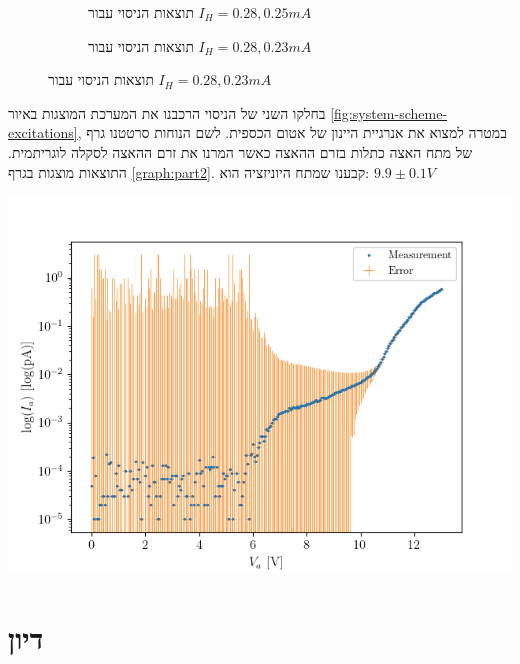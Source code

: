 \documentclass{article}
\begin{document}
\begin{figure}[H]
    \begin{subfigure}[b]{\textwidth}
    	\centering
	\resizebox{0.95\textwidth}{!}{}
    	\caption{תוצאות הניסוי עבור 
    	$I_H =0.28,0.25 mA$}
    	\label{fig:Changing_Ih_25-28mA}
    \end{subfigure}
    \hfill
    \begin{subfigure}[b]{\textwidth}
    	\centering
    	\resizebox{0.95\textwidth}{!}{}
    	\caption{תוצאות הניסוי עבור 
    	$I_H =0.28,0.23 mA$}
    	\label{fig:Changing_Ih_23-28mA}
    \end{subfigure}
\end{figure}


בחלקו השני של הניסוי הרכבנו את המערכת המוצגות באיור
\ref{fig:system-scheme-excitations}, 
במטרה למצוא את אנרגיית היינון של אטום הכספית.
לשם הנוחות סרטטנו גרף של מתח האצה כתלות בזרם ההאצה כאשר המרנו את זרם ההאצה לסקלה לוגריתמית.
התוצאות מוצגות בגרף
\ref{graph:part2}.
קבענו שמתח היוניזציה הוא:
$9.9 \pm 0.1 V$

\begin{graph}[H]
	\begin{center}
	 \includegraphics[width=\textwidth]{partTwo.png}
	\end{center}
	\caption{תוצאות יינון אטומי כספית}
	\label{graph:part2}
\end{graph}

\section{דיון}
\end{document}
